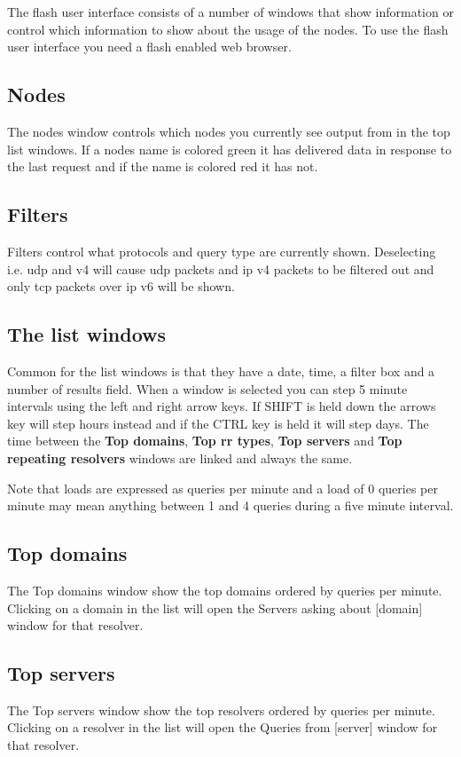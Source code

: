 \documentclass[a4paper]{article}
\begin{document}
The flash user interface consists of a number of windows that show 
information or control which information to show about the usage of the nodes.
To use the flash user interface you need a flash enabled web browser. 

\subsection{Nodes}
The nodes window controls which nodes you currently see output 
from in the top list windows.
If a nodes name is colored green it has delivered data in response 
to the last request and if the name is colored red it has not.

\subsection{Filters}
Filters control what protocols and query type are currently shown. Deselecting i.e. 
udp and v4 will cause udp packets and ip v4 packets to be filtered out 
and only tcp packets over ip v6 will be shown.

\subsection{The list windows}
Common for the list windows is that they have a date, time, a filter box and a 
number of results field.
When a window is selected you can step 5 minute intervals using the left and 
right arrow keys. If SHIFT is held down the arrows key will step hours instead 
and if the CTRL key is held it will step days.
The time between the \textbf{Top domains}, \textbf{Top rr types}, 
\textbf{Top servers} and \textbf{Top repeating resolvers} windows are 
linked and always the same.

Note that loads are expressed as queries per minute and a load of 0 queries per 
minute may mean anything between 1 and 4 queries during a five minute interval.


\subsection{Top domains}
The Top domains window show the top domains ordered by queries per minute. 
Clicking on a domain in the list will open the Servers asking about [domain] 
window for that resolver.

\subsection{Top servers}
The Top servers window show the top resolvers ordered by queries per minute. 
Clicking on a resolver in the list will open the Queries from [server] window 
for that resolver.
\end{document}
